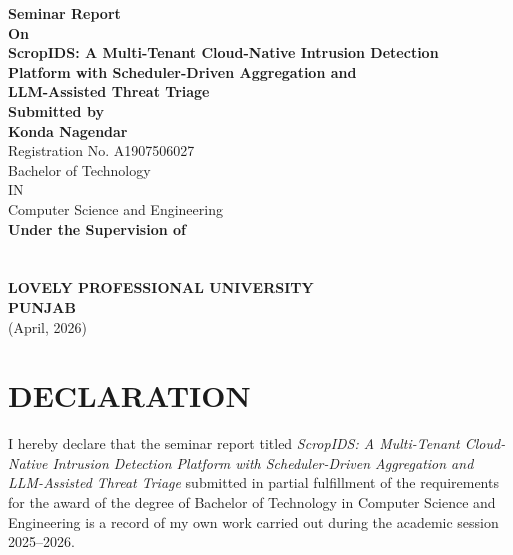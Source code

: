 \documentclass[12pt,a4paper]{report}
\begin{document}
\begin{titlepage}
\thispagestyle{empty}
\begin{center}
\vspace*{1.4cm}
{\bfseries\fontsize{18pt}{20pt}\selectfont Seminar Report}\\[1.1cm]
{\bfseries\fontsize{16pt}{18pt}\selectfont On}\\[0.7cm]
{\bfseries\fontsize{16pt}{18pt}\selectfont ScropIDS: A Multi-Tenant Cloud-Native Intrusion Detection}\\[0.15cm]
{\bfseries\fontsize{16pt}{18pt}\selectfont Platform with Scheduler-Driven Aggregation and}\\[0.15cm]
{\bfseries\fontsize{16pt}{18pt}\selectfont LLM-Assisted Threat Triage}\\[1.3cm]

{\bfseries\fontsize{14pt}{16pt}\selectfont Submitted by}\\[0.7cm]
{\bfseries\fontsize{14pt}{16pt}\selectfont Konda Nagendar}\\[0.3cm]
{\fontsize{12pt}{14pt}\selectfont Registration No. A1907506027}\\[1.0cm]

{\fontsize{12pt}{14pt}\selectfont Bachelor of Technology}\\[0.25cm]
{\fontsize{12pt}{14pt}\selectfont IN}\\[0.25cm]
{\fontsize{12pt}{14pt}\selectfont Computer Science and Engineering}\\[1.0cm]

{\bfseries\fontsize{14pt}{16pt}\selectfont Under the Supervision of}\\[0.5cm]
{\fontsize{12pt}{14pt}}\\[0.2cm]
{\fontsize{12pt}{14pt}\selectfont [Designation]}\\[1.4cm]

{\bfseries\fontsize{14pt}{16pt}\selectfont LOVELY PROFESSIONAL UNIVERSITY}\\[0.2cm]
{\bfseries\fontsize{14pt}{16pt}\selectfont PUNJAB}\\[0.8cm]
{\fontsize{12pt}{14pt}\selectfont (April, 2026)}
\end{center}
\end{titlepage}

\chapter*{DECLARATION}
\thispagestyle{empty}
I hereby declare that the seminar report titled \textit{ScropIDS: A Multi-Tenant Cloud-Native Intrusion Detection Platform with Scheduler-Driven Aggregation and LLM-Assisted Threat Triage} submitted in partial fulfillment of the requirements for the award of the degree of Bachelor of Technology in Computer Science and Engineering is a record of my own work carried out during the academic session 2025--2026.
\end{document}

